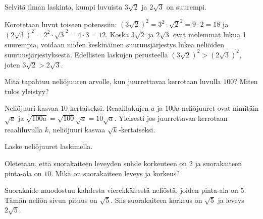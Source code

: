 \begin{tehtavasivu}
\begin{tehtava}
        Selvitä ilman laskinta, kumpi luvuista $3\sqrt{2}$ ja $2\sqrt{3}$ on suurempi. 
       
        \begin{vastaus}
        Korotetaan luvut toiseen potenssiin: $(3\sqrt{2})^2=3^2\cdot\sqrt{2}^2=9 \cdot 2=18$ ja $(2\sqrt{3})^2=2^2\cdot\sqrt{3}^2=4 \cdot 3=12$. Koska $3\sqrt{2}$ ja $2\sqrt{3}$ ovat molemmat lukua 1 suurempia, voidaan niiden keskinäinen suuruusjärjestys lukea neliöiden suuruusjärjestyksestä. Edellisten laskujen perusteella $(3\sqrt{2})^2 > (2\sqrt{3})^2$, joten $3\sqrt{2} > 2\sqrt{3}$.
        \end{vastaus}
\end{tehtava}

\begin{tehtava}
Mitä tapahtuu neliöjuuren arvolle, kun juurrettavaa kerrotaan luvulla $100$? Miten tulos yleistyy?
       
        \begin{vastaus}
        Neliöjuuri kasvaa $10$-kertaiseksi. Reaalilukujen $a$ ja $100a$ neliöjuuret ovat nimitäin $\sqrt{a}$ ja $\sqrt{100a}=\sqrt{100}\sqrt{a}=10\sqrt{a}$. Yleisesti jos juurrettavaa kerrotaan reaaliluvulla $k$, neliöjuuri kasvaa $\sqrt{k}$-kertaiseksi.
        \end{vastaus}
\end{tehtava}

\begin{tehtava}
Laske neliöjuuret laskimella.
	\begin{vastaus}
	\end{vastaus}
\end{tehtava}

\begin{tehtava}
Oletetaan, että suorakaiteen leveyden suhde korkeuteen on $2$ ja suorakaiteen pinta-ala on $10$. Mikä on suorakaiteen leveys ja korkeus?
\begin{vastaus}
Suorakaide muodostuu kahdesta vierekkäisestä neliöstä, joiden pinta-ala on $5$. Tämän neliön sivun pituus on $\sqrt{5}$. Siis suorakaiteen korkeus on $\sqrt{5}$ ja leveys $2\sqrt{5}$.
\end{vastaus}
\end{tehtava}


\end{tehtavasivu}

